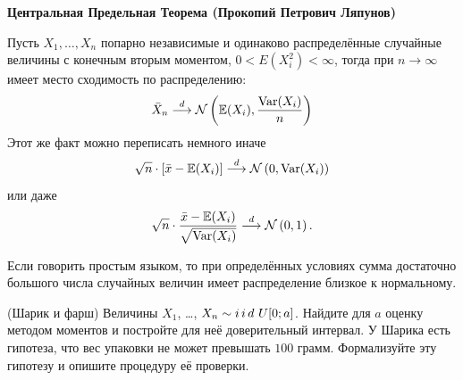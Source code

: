 \documentclass[12pt, a4paper, oneside]{article}
\begin{document}
\begin{theorem}{\textbf{Центральная Предельная Теорема (Прокопий Петрович Ляпунов)}}

Пусть $X_1, \ldots, X_n$ попарно независимые и одинаково распределённые случайные величины с конечным вторым моментом, $0 < E(X_i^2) < \infty$, тогда при $n \to \infty$ имеет место сходимость по распределению: 
\[
\bar{X}_n \stackrel{d}{\longrightarrow} \mathcal{N} \left(\mathbb{E}(X_i), \frac{\operatorname{Var}(X_i)}{n} \right)
\]
Этот же факт можно переписать немного иначе
\[
\sqrt{n} \cdot [\bar{x} - \mathbb{E}(X_i)]  \stackrel{d}{\longrightarrow} \mathcal{N} \left(0, \operatorname{Var}(X_i)\right)
\]
или даже 
\[
\sqrt{n} \cdot \frac{\bar{x} - \mathbb{E}(X_i)}{\sqrt{\operatorname{Var}(X_i)}}  \stackrel{d}{\longrightarrow} \mathcal{N} \left(0, 1\right).
\]
\end{theorem}
Если говорить простым языком, то при определённых условиях сумма достаточно большого числа случайных величин имеет распределение близкое к нормальному. 


\begin{problem}{(Шарик и фарш)}
Величины $X_1$, \ldots, $X_n \sim i\,i\,d\,\, U[0;a]$. Найдите для $a$ оценку методом моментов и постройте для неё доверительный интервал. У Шарика есть гипотеза, что вес упаковки не может превышать $100$ грамм. Формализуйте эту гипотезу и опишите процедуру её проверки. 
\end{problem}
\end{document}
